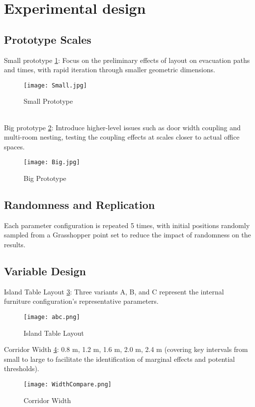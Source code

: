 \section{Experimental design}

\subsection{Prototype Scales}
Small prototype \ref{fig:small}: Focus on the preliminary effects of layout on evacuation paths and times, with rapid iteration through smaller geometric dimensions.
\begin{figure}[h]
    \centering
    \texttt{[image: Small.jpg]}
    \caption{Small Prototype}
    \label{fig:small}
\end{figure}
\\Big prototype \ref{fig:big}: Introduce higher-level issues such as door width coupling and multi-room nesting, testing the coupling effects at scales closer to actual office spaces.
\begin{figure}[h]
    \centering
    \texttt{[image: Big.jpg]}
    \caption{Big Prototype}
    \label{fig:big}
\end{figure}

\subsection{Randomness and Replication}
Each parameter configuration is repeated 5 times, with initial positions randomly sampled from a Grasshopper point set to reduce the impact of randomness on the results.

\subsection{Variable Design}
Island Table Layout \ref{fig:abc}: Three variants A, B, and C represent the internal furniture configuration's representative parameters.
\begin{figure}[h]
    \centering
    \texttt{[image: abc.png]}
    \caption{Island Table Layout}
    \label{fig:abc}
\end{figure}

Corridor Width \ref{fig:corridorwidth}: 0.8 m, 1.2 m, 1.6 m, 2.0 m, 2.4 m (covering key intervals from small to large to facilitate the identification of marginal effects and potential thresholds).
\begin{figure}[h]
    \centering
    \texttt{[image: WidthCompare.png]}
    \caption{Corridor Width}
    \label{fig:corridorwidth}
\end{figure}

